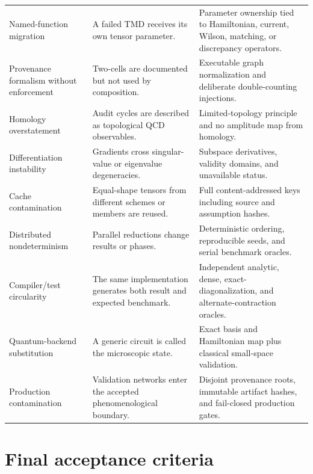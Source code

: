 \documentclass[11pt]{article}
\begin{document}
\begin{longtable}{L{0.22\textwidth}L{0.34\textwidth}L{0.35\textwidth}}
Named-function migration & A failed TMD receives its own tensor parameter. & Parameter ownership tied to Hamiltonian, current, Wilson, matching, or discrepancy operators.\\
Provenance formalism without enforcement & Two-cells are documented but not used by composition. & Executable graph normalization and deliberate double-counting injections.\\
Homology overstatement & Audit cycles are described as topological QCD observables. & Limited-topology principle and no amplitude map from homology.\\
Differentiation instability & Gradients cross singular-value or eigenvalue degeneracies. & Subspace derivatives, validity domains, and unavailable status.\\
Cache contamination & Equal-shape tensors from different schemes or members are reused. & Full content-addressed keys including source and assumption hashes.\\
Distributed nondeterminism & Parallel reductions change results or phases. & Deterministic ordering, reproducible seeds, and serial benchmark oracles.\\
Compiler/test circularity & The same implementation generates both result and expected benchmark. & Independent analytic, dense, exact-diagonalization, and alternate-contraction oracles.\\
Quantum-backend substitution & A generic circuit is called the microscopic state. & Exact basis and Hamiltonian map plus classical small-space validation.\\
Production contamination & Validation networks enter the accepted phenomenological boundary. & Disjoint provenance roots, immutable artifact hashes, and fail-closed production gates.\\
\bottomrule
\end{longtable}

\section{Final acceptance criteria}
\label{sec:acceptance}
\end{document}
